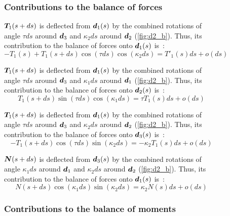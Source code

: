 \begin{figure}[p]
	\begin{fullpage}
	\subsubsection{Contributions to the balance of forces}
	\vspace{10pt}
	
	$\boldsymbol{T}_1(s+ds)$ is deflected from $\boldsymbol{d}_1(s)$ by the combined rotations of angle $\tau ds$ around $\boldsymbol{d}_3$ and $\kappa_2 ds$ around $\boldsymbol{d}_2$ (\cref{fig:d2_b}). Thus, its contribution to the balance of forces onto $\boldsymbol{d}_1(s)$ is~: 
	\begin{equation*}
		-T_1(s) + T_1(s+ds) \cos(\tau ds) \cos(\kappa_2 ds) = T'_1 (s) ds + o(ds)
	\end{equation*}
	
	$\boldsymbol{T}_1(s+ds)$ is deflected from $\boldsymbol{d}_1(s)$ by the combined rotations of angle $\tau ds$ around $\boldsymbol{d}_3$ and $\kappa_1 ds$ around $\boldsymbol{d}_1$ (\cref{fig:d2_b}). Thus, its contribution to the balance of forces onto $\boldsymbol{d}_2(s)$ is~: 
	\begin{equation*}
		T_1(s+ds) \sin(\tau ds) \cos(\kappa_1 ds) = \tau T_1 (s) ds + o(ds)
	\end{equation*}	
	
	$\boldsymbol{T}_1(s+ds)$ is deflected from $\boldsymbol{d}_1(s)$ by the combined rotations of angle $\tau ds$ around $\boldsymbol{d}_3$ and $\kappa_2 ds$ around $\boldsymbol{d}_2$ (\cref{fig:d2_b}). Thus, its contribution to the balance of forces onto $\boldsymbol{d}_3(s)$ is~: 
	\begin{equation*}
		-T_1(s+ds) \cos(\tau ds) \sin(\kappa_2 ds) = - \kappa_2 T_1(s) ds + o(ds)
	\end{equation*}	
	
	$\boldsymbol{N}(s+ds)$ is deflected from $\boldsymbol{d}_3(s)$ by the combined rotations of angle $\kappa_1 ds$ around $\boldsymbol{d}_1$ and $\kappa_2 ds$ around $\boldsymbol{d}_2$ (\cref{fig:d2_b}). Thus, its contribution to the balance of forces onto $\boldsymbol{d}_1(s)$ is~: 
	\begin{equation*}
		N(s+ds) \cos(\kappa_1 ds) \sin(\kappa_2 ds) = \kappa_2 N(s) ds + o(ds)
	\end{equation*}
	\vspace{10pt}

	\subsubsection{Contributions to the balance of moments}
	\vspace{10pt}
	

\end{fullpage}
\end{figure}
